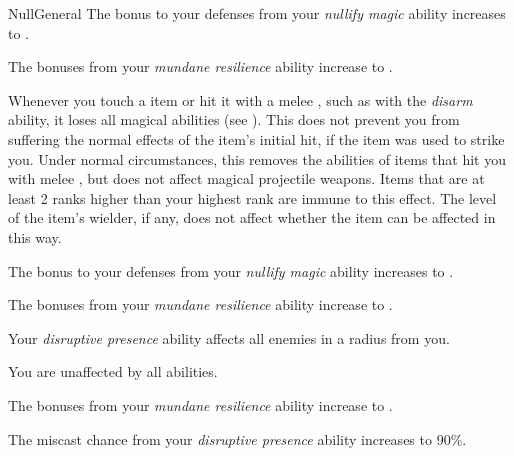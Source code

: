 \begin{feat}{Null}{General}
         The bonus to your defenses from your \textit{nullify magic} ability increases to .

         The bonuses from your \textit{mundane resilience} ability increase to .

         Whenever you touch a  item or hit it with a melee , such as with the \textit{disarm} ability, it  loses all magical abilities (see ).
        This does not prevent you from suffering the normal effects of the item's initial hit, if the item was used to strike you.
        Under normal circumstances, this removes the abilities of items that hit you with melee , but does not affect magical projectile weapons.
        Items that are at least 2 ranks higher than your highest rank are immune to this effect.
        The level of the item's wielder, if any, does not affect whether the item can be affected in this way.

         The bonus to your defenses from your \textit{nullify magic} ability increases to .

         The bonuses from your \textit{mundane resilience} ability increase to .

         Your \textit{disruptive presence} ability affects all enemies in a \areahuge radius  from you.

         You are unaffected by all  abilities.

         The bonuses from your \textit{mundane resilience} ability increase to .

         The miscast chance from your \textit{disruptive presence} ability increases to 90\%.
    \end{feat}

